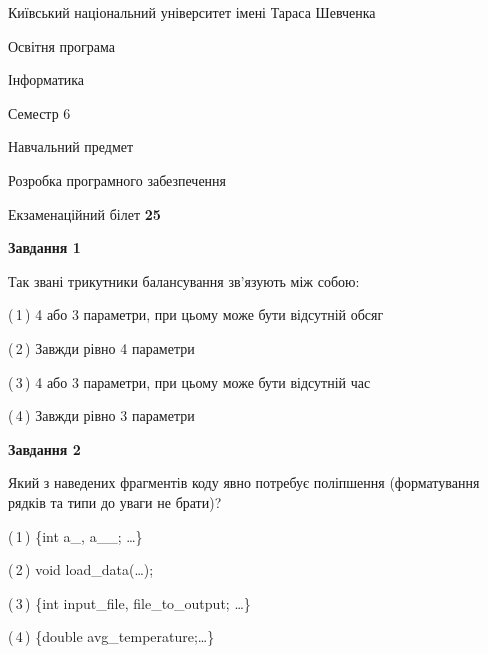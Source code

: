 \documentclass[10pt, ukrainian]{article}
\begin{document}
{{\begin {small}\par
{ \center  Київський національний університет імені Тараса Шевченка \par}
{\parbox {5 cm}{Освітня програма \hfill}{\parbox {7 cm}{Інформатика \hfill}}\parbox {6 cm}{\hfill Семестр 6}}\par
{\parbox {5 cm} {Навчальний предмет \hfill}\parbox {7 cm}{Розробка програмного забезпечення \hfill}\parbox {6cm}{\hfill}\par}\vspace{-7pt} \end{small}}{\center Екзаменаційний білет \No \textbf
{ 25 }\par}}
{
\begin {large}
{\begin {center}\textbf{Завдання 1}\end {center}}\par
Так звані трикутники балансування зв'язують між собою:\par
\vspace{2mm}



(\,1\,) 4 або 3 параметри, при цьому може бути відсутній обсяг %



(\,2\,) Завжди рівно 4 параметри%



(\,3\,) 4 або 3 параметри, при цьому може бути відсутній час%



(\,4\,) Завжди рівно 3 параметри%


{\begin {center}\textbf{Завдання 2}\end {center}}\par
Який з наведених фрагментів коду явно потребує поліпшення (форматування рядків та типи до уваги не брати)?\par
\vspace{2mm}



(\,1\,) \{int a\_, a\_\_; …\}%



(\,2\,) void load\_data(…);%



(\,3\,) \{int input\_file, file\_to\_output; …\}%



(\,4\,) \{double avg\_temperature;…\} %



\end{large}}
\end{document}
